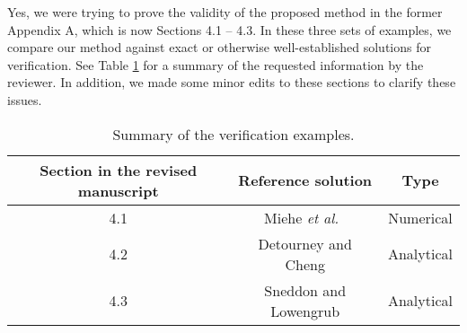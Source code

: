 \documentclass{elsarticle}
\begin{document}
{	%
{%
	Yes, we were trying to prove the validity of the proposed method in the former Appendix A, which is now Sections 4.1 -- 4.3.
	In these three sets of examples, we compare our method against exact or otherwise well-established solutions for verification. %
	See Table \ref{Tab:coupled_problem} for a summary of the requested information by the reviewer. In addition, we made some minor edits to these sections to clarify these issues.
\begin{table}[htbp]
	\centering
	\caption{Summary of the verification examples.}
		\begin{tabular}{c c c}
			\hline 
			Section in the revised manuscript & Reference solution & Type \\
       		\hline
			4.1 & Miehe \emph{et al.}~\cite{miehe2010phase} & Numerical \\
			4.2 & Detourney and Cheng \cite{detournay1988poroelastic} & Analytical \\
			4.3 & Sneddon and Lowengrub \cite{SneddonLowengrub69} & Analytical \\
			\hline
       	\end{tabular}
	\label{Tab:coupled_problem}
\end{table}

}}
\end{document}
